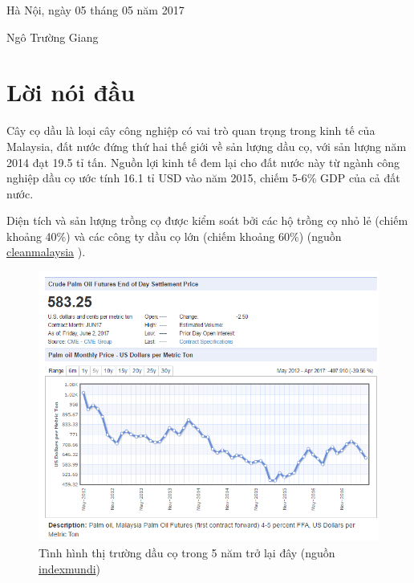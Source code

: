 \documentclass[14pt, oneside, a4paper, openany]{scrartcl}
\begin{document}
\begin{flushright}
	Hà Nội, ngày 05 tháng 05 năm 2017
\end{flushright}
\hspace{95 mm}Ngô Trường Giang

\newpage
\section{Lời nói đầu}
Cây cọ dầu là loại cây công nghiệp có vai trò quan trọng trong kinh tế của Malaysia, đất nước đứng thứ hai thế giới về sản lượng dầu cọ, với sản lượng năm 2014 đạt 19.5 tỉ tấn. Nguồn lợi kinh tế đem lại cho đất nước này từ ngành công nghiệp dầu cọ ước tính 16.1 tỉ USD vào năm 2015, chiếm 5-6\% GDP của cả đất nước.
 
Diện tích và sản lượng trồng cọ được kiểm soát bởi các hộ trồng cọ nhỏ lẻ (chiếm khoảng 40\%) và các công ty dầu cọ lớn (chiếm khoảng 60\%) (nguồn \href{http://cleanmalaysia.com/2015/12/09/just-how-big-is-malaysias-palm-oil-industry/}{cleanmalaysia} \cite{cleanmalay}).

\begin{figure}[!h]
	\centering
	\includegraphics[scale=0.8]{figures/oilPalmMarket.png} 
	\caption[Tình hình thị trường dầu cọ trong 5 năm trở lại đây]{Tình hình thị trường dầu cọ trong 5 năm trở lại đây (nguồn \href{http://www.indexmundi.com/commodities/?commodity=palm-oil&months=60}{indexmundi}\cite{indexmundi})}
\end{figure}
\end{document}
